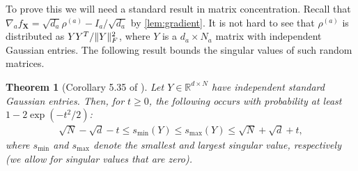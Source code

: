 \documentclass{article}
\newtheorem{theorem}{Theorem}
\DeclarePairedDelimiter{\norm}{\lVert}{\rVert}
\newcommand{\R}{{\mathbb{R}}}
\renewcommand{\vec}{\bm}
\begin{document}
To prove this we will need a standard result in matrix concentration.
Recall that $\nabla_a f_{\vec X} = \sqrt{d_a} \rho^{(a)} - I_a/\sqrt{d_a}$ by \cref{lem:gradient}.
It is not hard to see that $\rho^{(a)}$ is distributed as $Y Y^T / \norm{Y}_F^2$, where $Y$ is a $d_a \times N_a$ matrix with independent Gaussian entries.
The following result bounds the singular values of such random matrices.

\begin{theorem}[Corollary 5.35 of \cite{vershynin2010introduction}]\label{cor:vershynin}
Let $Y \in \R^{d \times N}$ have independent standard Gaussian entries.
Then, for $t \geq 0$, the following occurs with probability at least $1 - 2 \exp(-t^{2}/2)$:
\begin{align*}
  \sqrt{N} - \sqrt{d} - t \leq s_{\min}(Y) \leq s_{\max}(Y) \leq \sqrt{N} + \sqrt{d} + t,
\end{align*}
where $s_{\min}$ and $s_{\max}$ denote the smallest and largest singular value, respectively (we allow for singular values that are zero).
\end{theorem}
\end{document}
